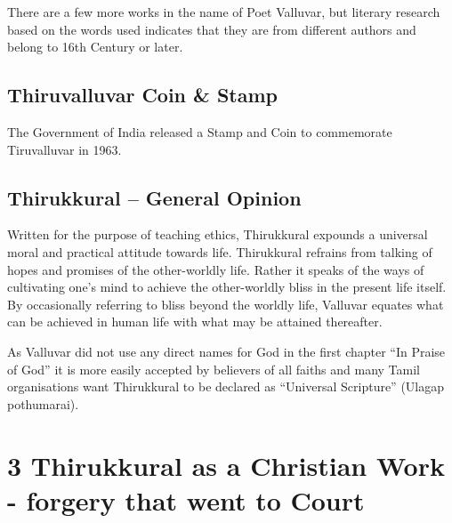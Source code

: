 There are a few more works in the name of Poet Valluvar, but literary research based on the words used indicates that they are from different authors and belong to 16th Century or later.


\subsection*{Thiruvalluvar Coin \& Stamp}

The Government of India released a Stamp and Coin to commemorate Tiruvalluvar in 1963.


\subsection*{Thirukkural – General Opinion}

Written for the purpose of teaching ethics, Thirukkural expounds a universal moral and practical attitude towards life. Thirukkural refrains from talking of hopes and promises of the other-worldly life. Rather it speaks of the ways of cultivating one's mind to achieve the other-worldly bliss in the present life itself. By occasionally referring to bliss beyond the worldly life, Valluvar equates what can be achieved in human life with what may be attained thereafter.

As Valluvar did not use any direct names for God in the first chapter “In Praise of God” it is more easily accepted by believers of all faiths and many Tamil organisations want Thirukkural to be declared as “Universal Scripture” (Ulagap pothumarai).


\section*{3 Thirukkural as a Christian Work - forgery that went to Court}

